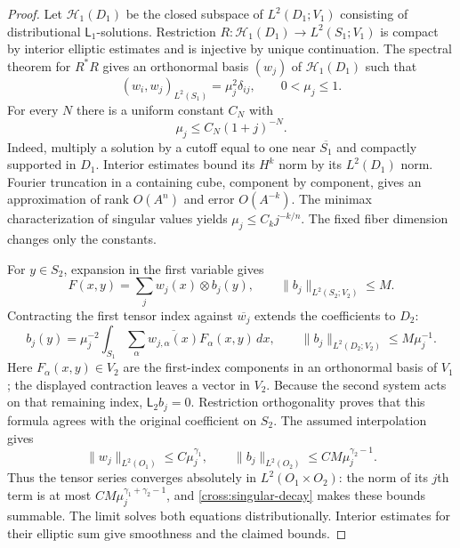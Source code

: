 \begin{proof}
Let $\mathcal H_1(D_1)$ be the closed subspace of
$L^2(D_1;V_1)$ consisting of distributional $\mathsf L_1$-solutions.
Restriction $R:\mathcal H_1(D_1)\to L^2(S_1;V_1)$ is compact by interior
elliptic estimates and is injective by unique continuation.  The spectral
theorem for $R^*R$ gives an orthonormal basis $(w_j)$ of
$\mathcal H_1(D_1)$ such that
\begin{equation}\label{cross:singular-values}
 (w_i,w_j)_{L^2(S_1)}=\mu_j^2\delta_{ij},\qquad 0<\mu_j\le1.
\end{equation}
For every $N$ there is a uniform constant $C_N$ with
\begin{equation}\label{cross:singular-decay}
 \mu_j\le C_N(1+j)^{-N}.
\end{equation}
Indeed, multiply a solution by a cutoff equal to one near
$\overline{S_1}$ and compactly supported in $D_1$.  Interior estimates
bound its $H^k$ norm by its $L^2(D_1)$ norm.  Fourier truncation in a
containing cube, component by component, gives an approximation of rank
$O(A^n)$ and error $O(A^{-k})$.  The minimax characterization of singular
values yields $\mu_j\le C_kj^{-k/n}$.  The fixed fiber dimension changes
only the constants.

For $y\in S_2$, expansion in the first variable gives
\[
 F(x,y)=\sum_j w_j(x)\otimes b_j(y),\qquad
 \|b_j\|_{L^2(S_2;V_2)}\le M.
\]
Contracting the first tensor index against $\overline{w_j}$ extends the
coefficients to $D_2$:
\begin{equation}\label{cross:coefficient-extension}
 b_j(y)=\mu_j^{-2}\int_{S_1}
                  \sum_\alpha\overline{w_{j,\alpha}(x)}F_{\alpha}(x,y)\,dx,
 \qquad \|b_j\|_{L^2(D_2;V_2)}\le M\mu_j^{-1}.
\end{equation}
Here $F_\alpha(x,y)\in V_2$ are the first-index components in an
orthonormal basis of $V_1$; the displayed contraction leaves a vector
in $V_2$.  Because the
second system acts on that remaining index, $\mathsf L_2b_j=0$.
Restriction orthogonality proves that this formula agrees with the
original coefficient on $S_2$.  The assumed interpolation gives
\[
 \|w_j\|_{L^2(O_1)}\le C\mu_j^{\gamma_1},\qquad
 \|b_j\|_{L^2(O_2)}\le CM\mu_j^{\gamma_2-1}.
\]
Thus the tensor series converges absolutely in $L^2(O_1\times O_2)$:
the norm of its $j$th term is at most
$CM\mu_j^{\gamma_1+\gamma_2-1}$, and
\eqref{cross:singular-decay} makes these bounds summable.  The limit
solves both equations distributionally.  Interior estimates for their
elliptic sum give smoothness and the claimed bounds.


\end{proof}
